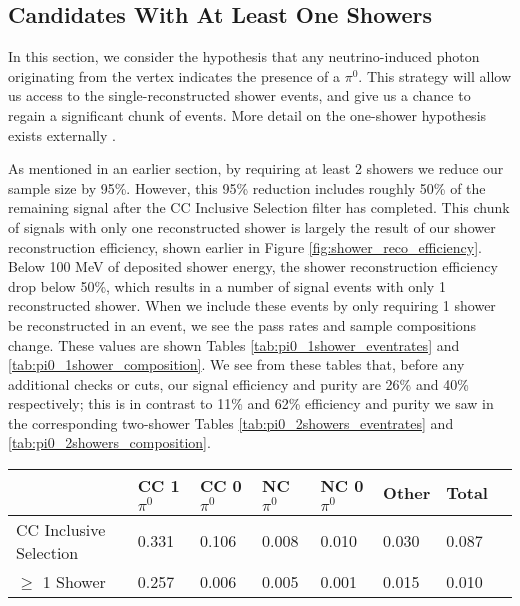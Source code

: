 \subsection{Candidates With At Least One Showers}
In this section, we consider the hypothesis that any neutrino-induced photon originating from the vertex indicates the presence of a $\pi^0$.  This strategy will allow us access to the single-reconstructed shower events, and give us a chance to regain a significant chunk of events. More detail on the one-shower hypothesis exists externally \cite{bib:timb_singleshower}.
\par As mentioned in an earlier section, by requiring at least 2 showers we reduce our sample size by 95\%.  However, this 95\% reduction includes roughly 50\% of the remaining signal after the CC Inclusive Selection filter has completed. This chunk of signals with only one reconstructed shower is largely the result of our shower reconstruction efficiency, shown earlier in Figure \ref{fig:shower_reco_efficiency}. Below 100 MeV of deposited shower energy, the shower reconstruction efficiency drop below 50\%, which results in a number of signal events with only 1 reconstructed shower. When we include these events by only requiring 1 shower be reconstructed in an event, we see the pass rates and sample compositions change.  These values are shown Tables \ref{tab:pi0_1shower_eventrates} and \ref{tab:pi0_1shower_composition}. We see from these tables that, before any additional checks or cuts, our signal efficiency and purity are 26\% and 40\% respectively; this is in contrast to 11\% and 62\% efficiency and purity we saw in the corresponding two-shower Tables \ref{tab:pi0_2showers_eventrates} and \ref{tab:pi0_2showers_composition}. 

\begin{table}[H]
\centering
{}
 \begin{tabular}{| l | l | l |l|l|l|l|l|}
 \hline
 & CC 1$\pi^0$ & CC 0$\pi^0$ & NC $\pi^0$ & NC 0$\pi^0$ & Other & Total \\ [0.1ex] \hline
CC Inclusive Selection & 0.331 & 0.106 & 0.008 & 0.010 & 0.030 & 0.087 \\
$\geq$ 1 Shower & 0.257 & 0.006 & 0.005 & 0.001 & 0.015 & 0.010 \\ \hline
\end{tabular}
\end{table}

